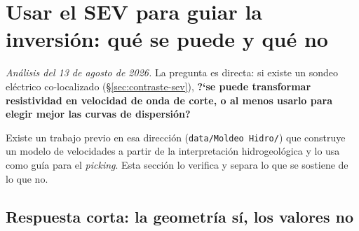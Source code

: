 \section{Usar el SEV para guiar la inversi\'on: qu\'e se puede y qu\'e no}
\label{sec:sev-guiada}

\emph{An\'alisis del 13 de agosto de 2026.} La pregunta es directa: si existe un
sondeo el\'ectrico co-localizado (\S\ref{sec:contraste-sev}),
\textbf{?`se puede transformar resistividad en velocidad de onda de corte, o al
menos usarlo para elegir mejor las curvas de dispersi\'on?}

Existe un trabajo previo en esa direcci\'on
(\texttt{data/Moldeo Hidro/}) que construye un modelo de velocidades a partir de
la interpretaci\'on hidrogeol\'ogica y lo usa como gu\'ia para el \emph{picking}.
Esta secci\'on lo verifica y separa lo que se sostiene de lo que no.

\subsection{Respuesta corta: la geometr\'ia s\'i, los valores no}


